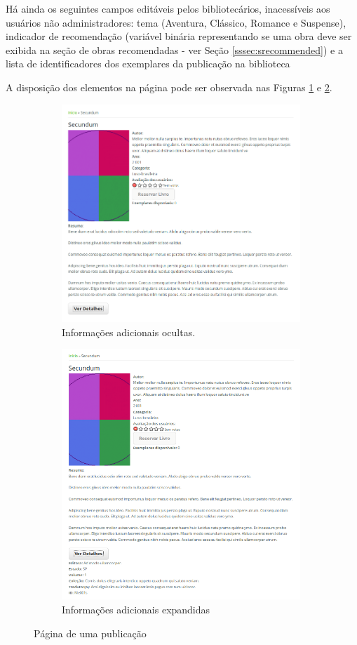 \documentclass[a4paper]{article}
\begin{document}
Há ainda os seguintes campos editáveis pelos bibliotecários, inacessíveis aos usuários não administradores: tema (Aventura, Clássico, Romance e Suspense), indicador de recomendação (variável binária representando se uma obra deve ser exibida na seção de obras recomendadas - ver Seção \ref{sssec:srecommended}) e a lista de identificadores dos exemplares da publicação na biblioteca

A disposição dos elementos na página pode ser observada nas Figuras \ref{colapsed} e \ref{expanded}.

\begin{figure}
\begin{subfigure}{.5\textwidth}
  \includegraphics[width=90mm]{img/publication-colapsed.png}
  \caption{Informações adicionais ocultas.}
  \label{colapsed}
\end{subfigure}%
\begin{subfigure}{.4\textwidth}
  \includegraphics[width=90mm]{img/publication-expanded.png}
  \caption{Informações adicionais expandidas}
  \label{expanded}
\end{subfigure}
\caption{Página de uma publicação}
\label{fig:publication}
\end{figure}
\end{document}
